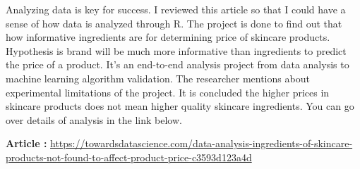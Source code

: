 \documentclass[
  letterpaper,
  DIV=11,
  numbers=noendperiod]{scrreprt}
\begin{document}
Analyzing data is key for success. I reviewed this article so that I
could have a sense of how data is analyzed through R. The project is
done to find out that how informative ingredients are for determining
price of skincare products. Hypothesis is brand will be much more
informative than ingredients to predict the price of a product. It's an
end-to-end analysis project from data analysis to machine learning
algorithm validation. The researcher mentions about experimental
limitations of the project. It is concluded the higher prices in
skincare products does not mean higher quality skincare ingredients. You
can go over details of analysis in the link below.

\textbf{Article :}
\url{https://towardsdatascience.com/data-analysis-ingredients-of-skincare-products-not-found-to-affect-product-price-c3593d123a4d}
\end{document}

